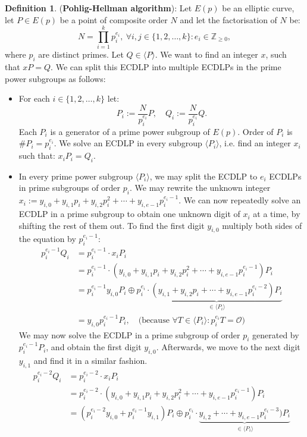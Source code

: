 \documentclass[thesis=M,english]{FITthesis}[2012/10/20]
\theoremstyle{remark}
\theoremstyle{definition}
\newtheorem{DF}{Definition}[section]
\begin{document}
\begin{DF}(\textbf{Pohlig-Hellman algorithm}): Let $E(p)$ be an elliptic curve, let $P \in E(p)$ be a point of composite order $N$ and let the factorisation of $N$ be:
$$
N = \prod_{i=1}^kp_i^{e_i},\ \forall i,j \in \{1, 2, \ldots, k\}: e_i \in \mathbb{Z}_{\geq 0},
$$ where $p_i$ are distinct primes. Let $Q \in \langle P \rangle$. We want to find an integer $x$, such that $xP = Q$. We can split this ECDLP into multiple ECDLPs in the prime power subgroups as follows:
 \begin{itemize}
 \item For each $i \in \{1, 2, \ldots, k\}$ let:
 $$
 P_i := \frac{N}{p_i^{e_i}}P, \quad Q_i := \frac{N}{p_i^{e_i}}Q.
 $$ Each $P_i$ is a generator of a prime power subgroup of $E(p)$. Order of $P_i$ is $\#P_i = p_i^{e_i}.$ We solve an ECDLP in every subgroup $\langle P_i \rangle$, i.e. find an integer $x_i$  such that: $x_iP_i = Q_i.$
 \item  In every prime power subgroup $\langle P_i \rangle$, we may split the ECDLP to $e_i$ ECDLPs in prime subgroups of order $p_i$.  We may rewrite the unknown integer $x_i := y_{i,0} + y_{i,1}p_i + y_{i,2}p_i^2+ \cdots + y_{i,e-1}p_i^{e_i-1}.$ We can now repeatedly solve an ECDLP in a prime subgroup to obtain one unknown digit of $x_i$ at a time, by shifting the rest of them out. To find the first digit $y_{i,0}$ multiply both sides of the equation by $p_i^{e_i-1}$:
\begin{align*}
p_i^{e_i-1} Q_i &= p_i^{e_i-1}\cdot x_i  P_i\\ 
&= p_i^{e_i-1}\cdot (y_{i,0} + y_{i,1}p_i + y_{i,2}p_i^2+ \cdots + y_{i,e-1}p_i^{e_i-1})P_i \\
&= p_i^{e_i-1}y_{i,0}P_i \oplus p_i^{e_i}\cdot\underbrace{(y_{i,1} + y_{i,2}p_i+ \cdots + y_{i,e-1}p_i^{e_i-2})P_i}_{\in \langle P_i \rangle} \\
&= y_{i,0}p_i^{e_i-1}P_i, \quad \text{(because }\forall T \in \langle P_i \rangle : p_i^{e_i}T = \mathcal{O})
\end{align*}
We may now solve the ECDLP in a prime subgroup of order $p_i$ generated by $p_i^{e_i-1}P_i$, and obtain the first digit $y_{i,0}.$ Afterwards, we move to the next digit $y_{i,1}$ and find it in a similar fashion.
\begin{align*}
p_i^{e_i-2} Q_i &= p_i^{e_i-2}\cdot x_i  P_i\\ 
&= p_i^{e_i-2}\cdot (y_{i,0} + y_{i,1}p_i + y_{i,2}p_i^2+ \cdots + y_{i,e-1}p_i^{e_i-1})P_i \\
&= (p_i^{e_i-2}y_{i,0} + p_i^{e_i-1}y_{i,1})P_i \oplus p_i^{e_i}\cdot\underbrace{y_{i,2}+ \cdots + y_{i,e-1}p_i^{e_i-3})P_i}_{\in \langle P_i \rangle} \\

\end{align*}
\end{itemize}
\end{DF}
\end{document}
